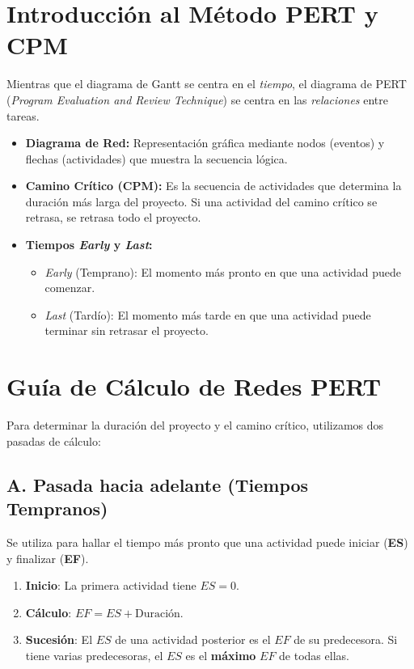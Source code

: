\documentclass[../main]{subfiles}
\begin{document}
\section{Introducción al Método PERT y CPM}
Mientras que el diagrama de Gantt se centra en el \textit{tiempo}, el
diagrama de PERT (\textit{Program Evaluation and Review Technique})
se centra en las \textit{relaciones} entre tareas.

\begin{itemize}
  \item \textbf{Diagrama de Red:} Representación gráfica mediante
    nodos (eventos) y flechas (actividades) que muestra la secuencia lógica.
  \item \textbf{Camino Crítico (CPM):} Es la secuencia de actividades
    que determina la duración más larga del proyecto. Si una
    actividad del camino crítico se retrasa, se retrasa todo el proyecto.
  \item \textbf{Tiempos \textit{Early} y \textit{Last}:}
    \begin{itemize}
      \item \textit{Early} (Temprano): El momento más pronto en que
        una actividad puede comenzar.
      \item \textit{Last} (Tardío): El momento más tarde en que
        una actividad puede terminar sin retrasar el proyecto.
    \end{itemize}
\end{itemize}

\newpage
\section{Guía de Cálculo de Redes PERT}
Para determinar la duración del proyecto y el camino crítico, utilizamos dos pasadas de cálculo:

\subsection{A. Pasada hacia adelante (Tiempos Tempranos)}
Se utiliza para hallar el tiempo más pronto que una actividad puede iniciar (\textbf{ES}) y finalizar (\textbf{EF}).
\begin{enumerate}
  \item \textbf{Inicio}: La primera actividad tiene $ES = 0$.
  \item \textbf{Cálculo}: $EF = ES + \text{Duración}$.
  \item \textbf{Sucesión}: El $ES$ de una actividad posterior es el $EF$ de su predecesora. Si tiene varias predecesoras, el $ES$ es el \textbf{máximo} $EF$ de todas ellas.
\end{enumerate}
\end{document}
